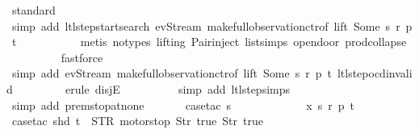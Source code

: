 \begin{isabellebody}
\ standard\isanewline
\ \ \ \ \ \ \ \ \ \isamarkupfalse%
\ {\isacharparenleft}simp\ add{\isacharcolon}\ ltl{\isacharunderscore}step{\isacharunderscore}startsearch\ ev{\isacharunderscore}Stream\ make{\isacharunderscore}full{\isacharunderscore}observation{\isachardot}ctr{\isacharbrackleft}of\ lift\ {\isachardoublequoteopen}Some\ s{\isachardoublequoteclose}\ r\ p\ t{\isacharbrackright}{\isacharparenright}\isanewline
\ \ \ \ \ \ \ \ \ \isamarkupfalse%
\ {\isacharparenleft}metis\ {\isacharparenleft}no{\isacharunderscore}types{\isacharcomma}\ lifting{\isacharparenright}\ Pair{\isacharunderscore}inject\ list{\isachardot}simps{\isacharparenleft}{}{\isacharparenright}\ opendoor{\isacharunderscore}{}\ prod{\isachardot}collapse{\isacharparenright}\isanewline
\ \ \ \ \ \ \ \ \isamarkupfalse%
\ fastforce\isanewline
\ \ \ \ \ \ \ \isamarkupfalse%
\ {\isacharparenleft}simp\ add{\isacharcolon}\ ev{\isacharunderscore}Stream\ make{\isacharunderscore}full{\isacharunderscore}observation{\isachardot}ctr{\isacharbrackleft}of\ lift\ {\isachardoublequoteopen}Some\ s{\isachardoublequoteclose}\ r\ p\ t{\isacharbrackright}\ ltl{\isacharunderscore}step{\isacharunderscore}ocd{\isacharunderscore}invalid{\isacharparenright}\isanewline
\ \ \ \ \ \ \ \isamarkupfalse%
\ {\isacharparenleft}erule\ disjE{\isacharparenright}\isanewline
\ \ \ \ \ \ \ \ \isamarkupfalse%
\ {\isacharparenleft}simp\ add{\isacharcolon}\ ltl{\isacharunderscore}step{\isachardot}simps{\isacharparenright}\isanewline
\ \ \ \ \ \ \ \isamarkupfalse%
\ {\isacharparenleft}simp\ add{\isacharcolon}\ prem{\isacharunderscore}stop{\isacharunderscore}at{\isacharunderscore}none{\isacharparenright}\isanewline
\isanewline
\ \ \ \ \ \isamarkupfalse%
\ {\isacharparenleft}case{\isacharunderscore}tac\ {\isachardoublequoteopen}s\ {\isasymin}\ {\isacharbraceleft}{}{\isacharcomma}\ {}{\isacharcomma}\ {}{\isacharcomma}\ {}{\isacharbraceright}{\isachardoublequoteclose}{\isacharparenright}\isanewline
\ \ \ \ \ \isamarkupfalse%
\ \ x\ s\ r\ p\ t\isanewline
\ \ \ \ \ \ \ \isamarkupfalse%
\ {\isacharparenleft}case{\isacharunderscore}tac\ {\isachardoublequoteopen}{\isacharparenleft}shd\ t{\isacharparenright}\ {\isacharequal}\ {\isacharparenleft}STR\ {\isacharprime}{\isacharprime}motorstop{\isacharprime}{\isacharprime}{\isacharcomma}\ {\isacharbrackleft}Str\ {\isacharprime}{\isacharprime}true{\isacharprime}{\isacharprime}{\isacharcomma}\ Str\ {\isacharprime}{\isacharprime}true{\isacharprime}{\isacharprime}{\isacharbrackright}{\isacharparenright}{\isachardoublequoteclose}{\isacharparenright}\isanewline

\end{isabellebody}
